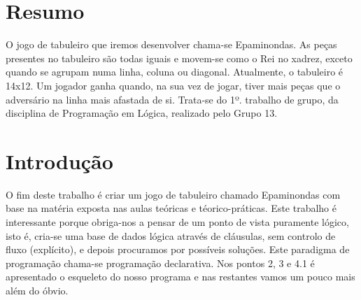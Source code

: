 \documentclass[a4paper]{article}
\begin{document}
\newpage

\section*{Resumo}
O jogo de tabuleiro que iremos desenvolver chama-se Epaminondas. As peças presentes no tabuleiro são todas
iguais e movem-se como o Rei no xadrez, exceto quando se agrupam numa linha, coluna ou diagonal. Atualmente, o tabuleiro é 14x12. Um jogador ganha quando, na sua vez de jogar, tiver mais peças que o adversário na linha mais afastada de si.
Trata-se do 1º. trabalho de grupo, da disciplina de Programação em Lógica, realizado pelo Grupo 13.



\section{Introdução}
O fim deste trabalho é criar um jogo de tabuleiro chamado Epaminondas com base na matéria exposta nas aulas teóricas e téorico-práticas.
Este trabalho é interessante porque obriga-nos a pensar de um ponto de vista puramente lógico, isto é, cria-se uma base de dados
lógica através de cláusulas, sem controlo de fluxo (explícito), e depois procuramos por possíveis soluções. Este paradigma de programação
chama-se programação declarativa. Nos pontos 2, 3 e 4.1 é apresentado o esqueleto do nosso programa e nas restantes vamos um pouco mais além do óbvio.



\end{document}

